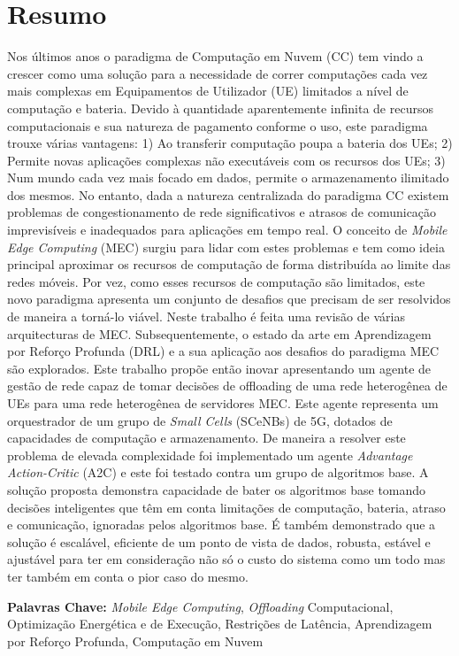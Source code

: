 \section*{Resumo}


\noindent Nos últimos anos o paradigma de Computação em Nuvem (\acrshort{CC}) tem vindo a crescer como uma solução para a necessidade de correr computações cada vez mais complexas em Equipamentos de Utilizador (\acrshort{UE}) limitados a nível de computação e bateria. Devido à quantidade aparentemente infinita de recursos computacionais e sua natureza de pagamento conforme o uso, este paradigma trouxe várias vantagens: 1) Ao transferir computação poupa a bateria dos \acrshort{UE}s; 2) Permite novas aplicações complexas não executáveis com os recursos dos \acrshort{UE}s; 3) Num mundo cada vez mais focado em dados, permite o armazenamento ilimitado dos mesmos. No entanto, dada a natureza centralizada do paradigma \acrshort{CC} existem problemas de congestionamento de rede significativos e atrasos de comunicação imprevisíveis e inadequados para aplicações em tempo real. O conceito de \emph{Mobile Edge Computing} (\acrshort{MEC}) surgiu para lidar com estes problemas e tem como ideia principal aproximar os recursos de computação de forma distribuída ao limite das redes móveis. Por vez, como esses recursos de computação são limitados, este novo paradigma apresenta um conjunto de desafios que precisam de ser resolvidos de maneira a torná-lo viável. Neste trabalho é feita uma revisão de várias arquitecturas de \acrshort{MEC}. Subsequentemente, o estado da arte em Aprendizagem por Reforço Profunda (\acrshort{DRL}) e a sua aplicação aos desafios do paradigma \acrshort{MEC} são explorados. Este trabalho propõe então inovar apresentando um agente de gestão de rede capaz de tomar decisões de offloading de uma rede heterogênea de \acrshort{UE}s para uma rede heterogênea de servidores \acrshort{MEC}. Este agente representa um orquestrador de um grupo de \emph{Small Cells} (\acrshort{SCeNBs}) de 5G, dotados de capacidades de computação e armazenamento. De maneira a resolver este problema de elevada complexidade foi implementado um agente \emph{Advantage Action-Critic} (\acrshort{A2C}) e este foi testado contra um grupo de algoritmos base. A solução proposta demonstra capacidade de bater os algoritmos base tomando decisões inteligentes que têm em conta limitações de computação, bateria, atraso e comunicação, ignoradas pelos algoritmos base. É também demonstrado que a solução é escalável, eficiente de um ponto de vista de dados, robusta, estável e ajustável para ter em consideração não só o custo do sistema como um todo mas ter também em conta o pior caso do mesmo. 

\vfill

\textbf{\Large Palavras Chave:} \emph{Mobile Edge Computing}, \emph{Offloading} Computacional, Optimização Energética e de Execução, Restrições de Latência, Aprendizagem por Reforço Profunda, Computação em Nuvem

